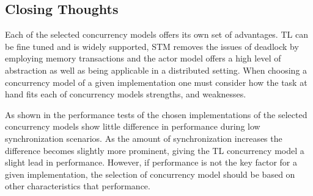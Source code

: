 




\subsection{Closing Thoughts}
Each of the selected concurrency models offers its own set of advantages. \ac{TL} can be fine tuned and is widely supported, \ac{STM} removes the issues of deadlock by employing memory transactions and the actor model offers a high level of abstraction as well as being applicable in a distributed setting. When choosing a concurrency model of a given implementation one must consider how the task at hand fits each of concurrency models strengths, and weaknesses.

As shown in the performance tests of  the chosen implementations of the selected concurrency models show little difference in performance during low synchronization scenarios. As the amount of synchronization increases the difference becomes slightly more prominent, giving the \ac{TL} concurrency model a slight lead in performance. However, if performance is not the key factor for a given implementation, the selection of concurrency model should be based on other characteristics that performance. %

